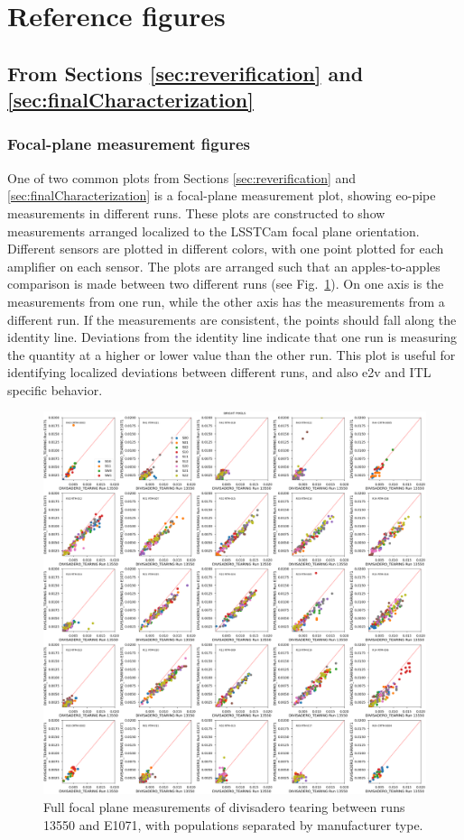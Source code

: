 \section{Reference figures}

\subsection{From Sections \ref{sec:reverification} and \ref{sec:finalCharacterization}}
\subsubsection{Focal-plane measurement figures}

One of two common plots from Sections \ref{sec:reverification} and \ref{sec:finalCharacterization} is a focal-plane measurement plot, showing eo-pipe measurements in different runs. These plots are constructed to show measurements arranged localized to the LSSTCam focal plane orientation. Different sensors are plotted in different colors, with one point plotted for each amplifier on each sensor. The plots are arranged such that an apples-to-apples comparison is made between two different runs (see Fig.~\ref{fig:ref:eoPipeFP_5x5}). On one axis is the measurements from one run, while the other axis has the measurements from a different run. If the measurements are consistent, the points should fall along the identity line. Deviations from the identity line indicate that one run is measuring the quantity at a higher or lower value than the other run. This plot is useful for identifying localized deviations between different runs, and also e2v and ITL specific behavior.

\begin{figure}
    \centering
    \includegraphics[width=0.5\linewidth]{figures/baselineCharacterization/13550_E1071_DIVISADERO_TEARING_inset.png}
    \caption{Full focal plane measurements of divisadero tearing between runs 13550 and E1071, with populations separated by manufacturer type.}
    \label{fig:ref:eoPipeFP_5x5}
\end{figure}

